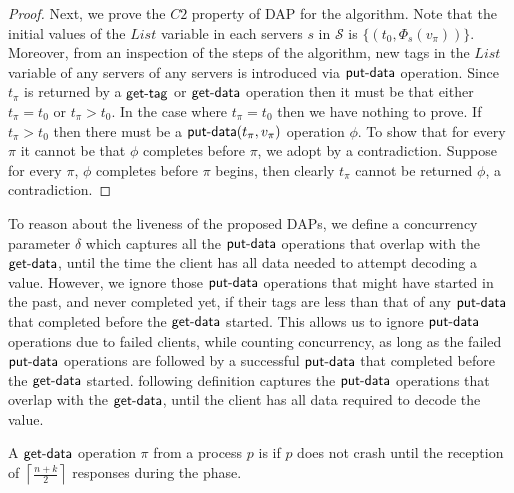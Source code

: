 \begin{proof}
Next, we prove the $C2$ property of DAP for the \treas{} algorithm. Note that the initial values of the $List$ variable in each servers $s$ in $\mathcal{S}$ is 
$\{ (t_0, \Phi_s(v_{\pi}) )\}$. Moreover, from an inspection of the steps of the algorithm, new tags in the $List$ variable of any servers of any servers is introduced via $\act{put-data}$ operation. Since $t_{\pi}$ is returned by a $\act{get-tag}$ or 
$\act{get-data}$ operation then it must be that either $t_{\pi}=t_0$ or $t_{\pi} > t_0$. In the case where $t_{\pi} = t_0$ then we have nothing to prove. If $t_{\pi} > t_0$ then there must be a $\act{put-data}(t_{\pi}, v_{\pi})$ operation $\phi$. To show that for every $\pi$ it cannot be that $\phi$ completes before $\pi$, we adopt by a contradiction. Suppose for every $\pi$, $\phi$ completes before $\pi$ begins, then clearly $t_{\pi}$ cannot be returned $\phi$, a contradiction.
\end{proof}
			
	 \label{sec:treas_liveness}
    To reason about the liveness of the proposed DAPs, we define a concurrency parameter $\delta$ which  captures all the  $\act{put-data}$ operations that overlap with the $\act{get-data}$, until the time the client has all data needed to attempt decoding a value. However, we ignore those $\act{put-data}$ operations that might have started in the past, and never completed yet, if their tags are less than that of any $\act{put-data}$ that completed before the  $\act{get-data}$  started. This allows us to ignore $\act{put-data}$ operations due to failed clients, while counting concurrency, as long as the failed $\act{put-data}$ operations are followed by a successful $\act{put-data}$ that completed before the $\act{get-data}$ started. 				
  following definition captures the $\act{put-data}$ operations that overlap with the $\act{get-data}$, until  the client has all data required to  decode the value.
				
\begin{definition}
A $\act{get-data}$  operation $\pi$ from a process $p$ is   if 
$p$ does not crash until the reception of $\left\lceil \frac{n+k}{2} \right\rceil$ responses during the{\GetData} phase. 
\end{definition}
					
